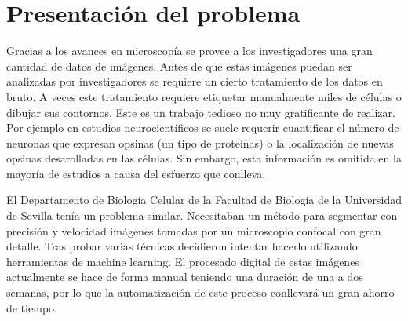 \chapter{Presentaci\'on del problema}\label{defobjetivos}

Gracias a los avances en microscopía se provee a los investigadores una gran cantidad de datos de imágenes. Antes de que estas imágenes puedan ser analizadas por investigadores se requiere un cierto tratamiento de los datos en bruto. A veces este tratamiento requiere etiquetar manualmente miles de células o dibujar sus contornos. Este es un trabajo tedioso no muy gratificante de realizar. Por ejemplo en estudios neurocientíficos se suele requerir cuantificar el número de neuronas que expresan opsinas (un tipo de proteínas) o la localización de nuevas opsinas desarolladas en las células. Sin embargo, esta información es omitida en la mayoría de estudios a causa del esfuerzo que conlleva.

El Departamento de Biología Celular de la Facultad de Biología de la Universidad de Sevilla tenía un problema similar. Necesitaban un método para segmentar con precisión y velocidad imágenes tomadas por un microscopio confocal con gran detalle. Tras probar varias técnicas decidieron intentar hacerlo utilizando herramientas de machine learning. El procesado digital de estas imágenes actualmente se hace de forma manual teniendo una duración de una a dos semanas, por lo que la automatización de este proceso conllevará un gran ahorro de tiempo.